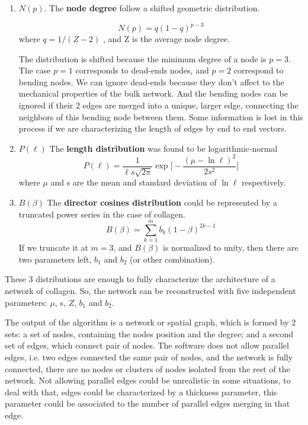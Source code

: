 \begin{enumerate} 
\item \textbf{$N(p)$}. The \textbf{node degree} follow a shifted geometric
distribution.

\begin{equation} \label{degree-dist}
N(p)=q(1-q)^{p-3} 
\end{equation}
where $q=1/(Z-2)$ , and Z is the average node degree.

The distribution is shifted because the minimum degree of a node is
$p=3$. The case $p=1$ corresponds to dead-ends nodes, and $p=2$ correspond to
bending nodes. We can ignore dead-ends because they don't affect to the mechanical properties of the bulk network. And the bending nodes
can be ignored if their $2$ edges are merged into a unique, larger edge,
connecting the neighbors of this bending node between them. Some information is lost in this
process if we are characterizing the length of edges by end to end
vectors.

\item \textbf{$P(\ell)$} The \textbf{length distribution} was found to be
logarithmic-normal
\begin{equation} \label{length-dist}
P(\ell)=\frac{1}{\ell
s\sqrt{2\pi}}\exp{\bigg[-\frac{(\mu-\ln{\ell})^2}{2s^2}\bigg]}
\end{equation}
where $\mu$ and s are the mean and standard deviation of $\ln{\ell}$
respectively.

\item \textbf{$B(\beta)$} The \textbf{director cosines distribution} could be
represented by a truncated power series in the case of collagen.
\begin{equation} \label{cosines-dist}
B(\beta)=\sum_{k=1}^{m} b_k(1-\beta)^{2k-1}
\end{equation}
If we truncate it at $m=3$, and $B(\beta)$ is normalized to unity, then there
are two parameters left, $b_1$ and $b_2$ (or other combination).
\end{enumerate}

These $3$ distributions are enough to fully characterize the architecture of a
network of collagen. So, the network can be reconstructed with five
independent parameters:
$\mu$, s, $Z$, $b_1$ and $b_2$.


The output of the algorithm is a network or spatial \gls{graph}, which is formed
by $2$ sets: a set of nodes, containing the nodes
position and the degree; and a second set of edges, which connect pair of
nodes. The software
does not allow parallel edges, i.e. two edges connected the same pair of nodes,
and the network is fully connected,  there are no nodes or clusters of nodes
isolated  from the rest of the network. Not allowing parallel edges could be
unrealistic in some situations, to deal with that, edges could be characterized
by a thickness parameter, this parameter could be associated to the number of
parallel edges merging in that edge.
